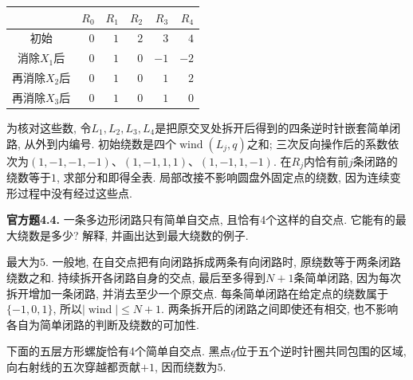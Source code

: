 \begin{solution}
\begin{center}
\begin{tabular}{c|rrrrr}
 & $R_0$ & $R_1$ & $R_2$ & $R_3$ & $R_4$ \\\hline
初始 & $0$ & $1$ & $2$ & $3$ & $4$ \\
消除$X_1$后 & $0$ & $1$ & $0$ & $-1$ & $-2$ \\
再消除$X_2$后 & $0$ & $1$ & $0$ & $1$ & $2$ \\
再消除$X_3$后 & $0$ & $1$ & $0$ & $1$ & $0$
\end{tabular}
\end{center}
为核对这些数, 令$L_1,L_2,L_3,L_4$是把原交叉处拆开后得到的四条逆时针嵌套简单闭路, 从外到内编号. 初始绕数是四个$\operatorname{wind}(L_j,q)$之和; 三次反向操作后的系数依次为$(1,-1,-1,-1)$、$(1,-1,1,1)$、$(1,-1,1,-1)$. 在$R_j$内恰有前$j$条闭路的绕数等于$1$, 求部分和即得全表. 局部改接不影响圆盘外固定点的绕数, 因为连续变形过程中没有经过这些点.
\end{solution}

\begin{exercise}\label{cq:4.4}
\textbf{官方题4.4.} 一条多边形闭路只有简单自交点, 且恰有4个这样的自交点. 它能有的最大绕数是多少? 解释, 并画出达到最大绕数的例子.
\end{exercise}
\begin{solution}
最大为$5$. 一般地, 在自交点把有向闭路拆成两条有向闭路时, 原绕数等于两条闭路绕数之和. 持续拆开各闭路自身的交点, 最后至多得到$N+1$条简单闭路, 因为每次拆开增加一条闭路, 并消去至少一个原交点. 每条简单闭路在给定点的绕数属于$\{-1,0,1\}$, 所以$|\operatorname{wind}|\le N+1$. 两条拆开后的闭路之间即使还有相交, 也不影响各自为简单闭路的判断及绕数的可加性.

下面的五层方形螺旋恰有4个简单自交点. 黑点$q$位于五个逆时针圈共同包围的区域, 向右射线的五次穿越都贡献$+1$, 因而绕数为$5$.
\begin{center}
\end{center}
\end{solution}

